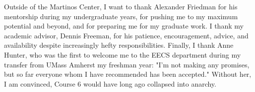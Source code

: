Outside of the Martinos Center, I want to thank Alexander Friedman for his mentorship during my undergraduate years, for pushing me to my maximum potential and beyond, and for preparing me for my graduate work. I thank my academic advisor, Dennis Freeman, for his patience, encouragement, advice, and availability despite increasingly hefty responsibilities. Finally, I thank Anne Hunter, who was the first to welcome me to the EECS department during my transfer from UMass Amherst my freshman year: "I'm not making any promises, but so far everyone whom I have recommended has been accepted." Without her, I am convinced, Course 6 would have long ago collapsed into anarchy. 

\cleardoublepage

\tableofcontents

\restoregeometry
